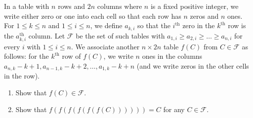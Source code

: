In a table with $n$ rows and $2n$ columns where $n$ is a fixed positive integer, we write either zero or one into each cell so that each row has $n$ zeros and $n$ ones. For $1 \le k \le n$ and $1 \le i \le n$, we define $a_{k,i}$ so that the $i^{\text{th}}$ zero in the $k^{\text{th}}$ row is the $a_{k,i}^{\text{th}}$ column. Let $\mathcal F$ be the set of such tables with $a_{1,i} \ge a_{2,i} \ge \dots \ge a_{n,i}$ for every $i$ with $1 \le i \le n$. We associate another $n \times 2n$ table $f(C)$ from $C \in \mathcal F$ as follows: for the $k^{\text{th}}$ row of $f(C)$, we write $n$ ones in the columns $a_{n,k}-k+1, a_{n-1,k}-k+2, \dots, a_{1,k}-k+n$ (and we write zeros in the other cells in the row).
\begin{enumerate}[label=(\alph*)]
	\item Show that $f(C) \in \mathcal F$.
	\item Show that $f(f(f(f(f(f(C)))))) = C$ for any $C \in \mathcal F$.
\end{enumerate}